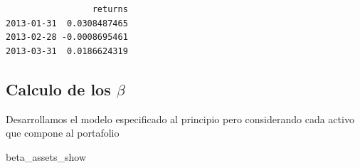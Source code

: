 \documentclass[
  letterpaper,
  DIV=11,
  numbers=noendperiod]{scrartcl}
\newenvironment{Shaded}{\begin{snugshade}}{\end{snugshade}}
\newcommand{\AttributeTok}[1]{\textcolor[rgb]{0.40,0.45,0.13}{#1}}
\newcommand{\DecValTok}[1]{\textcolor[rgb]{0.68,0.00,0.00}{#1}}
\newcommand{\FunctionTok}[1]{\textcolor[rgb]{0.28,0.35,0.67}{#1}}
\newcommand{\NormalTok}[1]{\textcolor[rgb]{0.00,0.23,0.31}{#1}}
\newcommand{\OtherTok}[1]{\textcolor[rgb]{0.00,0.23,0.31}{#1}}
\newcommand{\SpecialCharTok}[1]{\textcolor[rgb]{0.37,0.37,0.37}{#1}}
\begin{document}
\begin{verbatim}
                 returns
2013-01-31  0.0308487465
2013-02-28 -0.0008695461
2013-03-31  0.0186624319
\end{verbatim}

\subsection{\texorpdfstring{Calculo de los
\(\beta\)}{Calculo de los \textbackslash beta}}\label{calculo-de-los-beta}

Desarrollamos el modelo especificado al principio pero considerando cada
activo que compone al portafolio

\begin{Shaded}
\end{Shaded}

\begin{Shaded}
\begin{Highlighting}[]
\NormalTok{beta\_assets\_show}
\end{Highlighting}
\end{Shaded}
\end{document}
